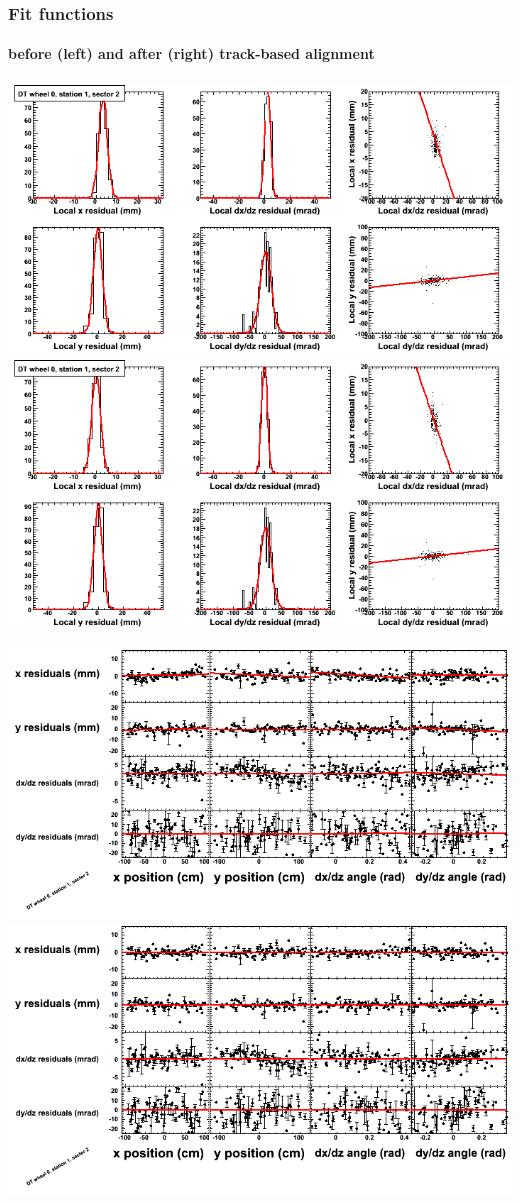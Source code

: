 \documentclass[compress]{beamer}
\begin{document}
\begin{frame}
\frametitle{Fit functions}
\framesubtitle{before (left) and after (right) track-based alignment}
\includegraphics[width=0.5\linewidth]{fitfunctions_re01/MBwhCst1sec02_bellcurves.png} \includegraphics[width=0.5\linewidth]{fitfunctions_re05/MBwhCst1sec02_bellcurves.png}

\includegraphics[width=0.5\linewidth]{fitfunctions_re01/MBwhCst1sec02_polynomials.png} \includegraphics[width=0.5\linewidth]{fitfunctions_re05/MBwhCst1sec02_polynomials.png}
\end{frame}
\end{document}
